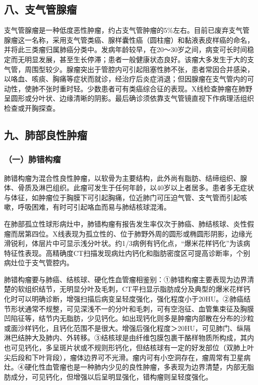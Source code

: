 \subsection{八、支气管腺瘤}

支气管腺瘤是一种低度恶性肿瘤，约占支气管肿瘤的5\%左右。目前已废弃支气管腺瘤这一名称，采用支气管类癌、腺样囊性癌（圆柱瘤）和黏液表皮样癌的命名，并将此三类瘤归属肺癌分类中。发病年龄较早，在20～30岁之间，病变可长时间稳定而无明显发展，甚至生长停滞；患者一般健康状态良好。该瘤大多发生于大的支气管，周围型较少。腺瘤突出于管腔内可引起阻塞性肺不张，患者常因合并感染，以咯血、咳痰、胸痛等症状而就诊，经治疗后炎症消退；但因腺瘤在支气管内的可动性，使肺不张时重时轻。少数患者可有类癌综合征的表现。X线检查肿瘤在肺野呈圆形或分叶状、边缘清晰的阴影。最后确诊须依靠支气管镜直视下作病理活组织检查或开胸探查。

\subsection{九、肺部良性肿瘤}

\subsubsection{（一）肺错构瘤}

肺错构瘤为混合性良性肿瘤，以软骨为主要结构，此外尚有脂肪、结缔组织、腺体、骨质及淋巴组织。此瘤可发生于任何年龄，以40岁以上者居多。患者多无症状与体征，如肿瘤位于胸膜下可引起胸痛，位近肺门可压迫气管、支气管而引起咳嗽，呼吸困难，有时可引起咯血而易与肺结核球混淆。

在肺部孤立性球形病灶中，肺错构瘤有报告发生率仅次于肺癌、肺结核球、炎性假瘤而居第四位。X线表现为孤立性的、位于肺野外周的圆形或椭圆形阴影，边缘光滑锐利，体层片中可显示浅分叶状。约1/3病例有钙化点，“爆米花样钙化”为该病特征性表现。高精确度CT扫描发现病灶内钙化和脂肪密度区可提高诊断率，个别病灶位于支气管腔内。

肺错构瘤要与肺癌、结核球、硬化性血管瘤相鉴别：①肺错构瘤主要表现为边界清楚的软组织结节，无明显分叶及毛刺，CT平扫显示脂肪成分及典型的爆米花样钙化时可以明确诊断，增强扫描后病变呈轻度强化，强化程度小于20HU。②肺癌结节形状通常不规整，可见深浅不一的分叶和毛刺，可有空泡征、血管集束征及胸膜凹陷征等，结节内无脂肪，少见钙化。如出现钙化则多是肿瘤内部散在分布的沙粒或面沙样钙化，且钙化范围不是很大。增强后强化程度＞20HU，可见肺门、纵隔淋巴结肿大及肺内、外转移。③结核球是由纤维包膜包裹干酪样物质所构成，其内也可见钙化，多呈斑片状或不规则形钙化，但结核球有一定的好发部位（双肺上叶尖后段和下叶背段），瘤体边界可不光滑。瘤内可有小空洞存在，瘤周常有卫星病灶。④硬化性血管瘤也是一种肺内少见的良性肿瘤，多表现为边界清楚，内部无脂肪成分，可见钙化，但增强以后呈明显强化，错构瘤则呈轻度强化。

